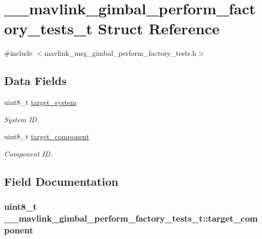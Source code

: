 \hypertarget{struct____mavlink__gimbal__perform__factory__tests__t}{\section{\+\_\+\+\_\+mavlink\+\_\+gimbal\+\_\+perform\+\_\+factory\+\_\+tests\+\_\+t Struct Reference}
\label{struct____mavlink__gimbal__perform__factory__tests__t}
}


{\ttfamily \#include $<$mavlink\+\_\+msg\+\_\+gimbal\+\_\+perform\+\_\+factory\+\_\+tests.\+h$>$}

\subsection*{Data Fields}
\begin{DoxyCompactItemize}
\item 
uint8\+\_\+t \hyperlink{struct____mavlink__gimbal__perform__factory__tests__t_a6ea64b154927838538b3a7c6675366d5}{target\+\_\+system}
\begin{DoxyCompactList}\small\item\em System I\+D. \end{DoxyCompactList}\item 
uint8\+\_\+t \hyperlink{struct____mavlink__gimbal__perform__factory__tests__t_a26448fc6c9720b2adb54b2760c102a3d}{target\+\_\+component}
\begin{DoxyCompactList}\small\item\em Component I\+D. \end{DoxyCompactList}\end{DoxyCompactItemize}


\subsection{Field Documentation}
\hypertarget{struct____mavlink__gimbal__perform__factory__tests__t_a26448fc6c9720b2adb54b2760c102a3d}{
\subsubsection[{target\+\_\+component}]{\setlength{\rightskip}{0pt plus 5cm}uint8\+\_\+t \+\_\+\+\_\+mavlink\+\_\+gimbal\+\_\+perform\+\_\+factory\+\_\+tests\+\_\+t\+::target\+\_\+component}}\label{struct____mavlink__gimbal__perform__factory__tests__t_a26448fc6c9720b2adb54b2760c102a3d}


